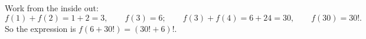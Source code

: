 Work from the inside out:
\[
f(1)+f(2)=1+2=3,\qquad f(3)=6;\qquad f(3)+f(4)=6+24=30,\qquad f(30)=30!.
\]
So the expression is $f(6+30!)=\boxed{(30!+6)!}$.
